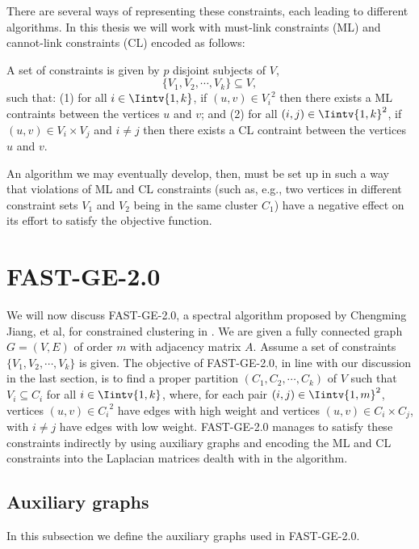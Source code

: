 There are several ways of representing these constraints, each leading to different algorithms. 
In this thesis we will work with must-link constraints (ML) and cannot-link constraints (CL) encoded as follows:

A set of constraints is given by $p$ disjoint subjects of $V$,
\begin{equation}
   \{ V_1, V_2, \cdots, V_k \} \subseteq V,
\end{equation}
such that: (1) for all $i \in \Iintv{1,k}$, if $(u,v) \in {V_i}^2$ then there exists a ML contraints between the vertices $u$ and $v$; and (2) for all $(i,j) \in \Iintv{1,k}^2$, if $(u,v) \in V_i \times V_j$ and $i \ne j$ then there exists a CL contraint between the vertices $u$ and $v$. 

An algorithm we may eventually develop, then, must be set up in such a way that violations of ML and CL constraints (such as, e.g., two vertices in different constraint sets $V_1$ and $V_2$ being in the same cluster $C_1$) have a negative effect on its effort to satisfy the objective function.

\section{FAST-GE-2.0}
We will now discuss FAST-GE-2.0, a spectral algorithm proposed by Chengming Jiang, et al, for constrained clustering in \cite{fastge2}.
We are given a fully connected graph $G = (V,E)$ of order $m$ with adjacency matrix $A$.
Assume a set of constraints $\{V_1, V_2, \cdots, V_k \}$ is given.
The objective of FAST-GE-2.0, in line with our discussion in the last section, is to find a proper partition $(C_1, C_2, \cdots, C_k)$ of $V$ such that $V_i \subseteq C_i$ for all $i \in \Iintv{1,k}$, where, for each pair $(i,j) \in \Iintv{1,m}^2$, vertices $(u,v) \in {C_i}^2$ have edges with high weight and vertices $(u,v) \in {C_i} \times {C_j}$, with $i \ne j$ have edges with low weight.
FAST-GE-2.0 manages to satisfy these constraints indirectly by using auxiliary graphs and encoding the ML and CL constraints into the Laplacian matrices dealth with in the algorithm.

\subsection{Auxiliary graphs}
In this subsection we define the auxiliary graphs used in FAST-GE-2.0.


